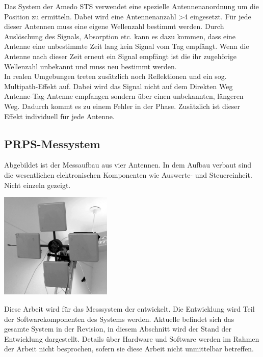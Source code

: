 Das System der Amedo STS verwendet eine spezielle Antennenanordnung um die Position zu ermitteln. Dabei wird eine Antennenanzahl >4 eingesetzt. Für jede dieser Antennen muss eine eigene Wellenzahl bestimmt werden. Durch Auslöschung des Signals, Absorption etc. kann es dazu kommen, dass eine Antenne eine unbestimmte Zeit lang kein Signal vom Tag empfängt. Wenn die Antenne nach dieser Zeit erneut ein Signal empfängt ist die ihr zugehörige Wellenzahl unbekannt und muss neu bestimmt werden. \\
%

In realen Umgebungen treten zusätzlich noch Reflektionen und ein sog. Multipath-Effekt auf. Dabei wird das Signal nicht auf dem Direkten Weg Antenne-Tag-Antenne empfangen sondern über einen unbekannten, längeren Weg. Dadurch kommt es zu einem Fehler in der Phase. Zusätzlich ist dieser Effekt individuell für jede Antenne.
%

\subsection{PRPS-Messystem}
%
\begin{floatingfigure}[hr!]{7cm}
         \centering
         \caption[PRPS der \amedogmbh]{Abgebildet ist der Messaufbau aus vier Antennen. In dem Aufbau verbaut sind die wesentlichen elektronischen Komponenten wie Auswerte- und Steuereinheit. Nicht einzeln gezeigt.}
         \vspace{2mm}
         \label{fig:System}
         \includegraphics[width=0.4\textwidth]{img/4AntennaSetup_small.png}
         \vspace{2mm}
%         
\end{floatingfigure}
%
Diese Arbeit wird für das Messsystem der \amedogmbh entwickelt. Die Entwicklung wird Teil der Softwarekomponenten des Systems werden. Aktuelle befindet sich das gesamte System in der Revision, in diesem Abschnitt wird der Stand der Entwicklung dargestellt. Details über Hardware und Software werden im Rahmen der Arbeit nicht besprochen, sofern sie diese Arbeit nicht unmittelbar betreffen. \\
%

